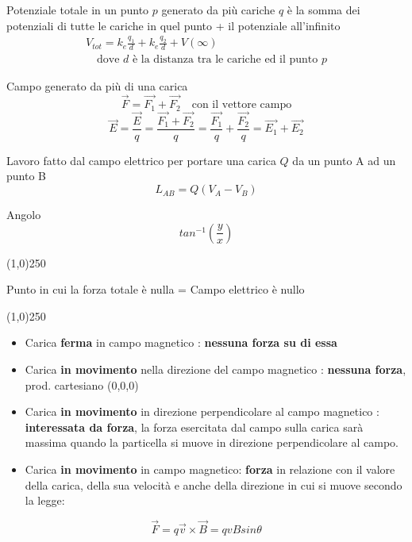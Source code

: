 \documentclass[14pt]{extarticle}
\begin{document}
Potenziale totale in un punto $p$ generato da più cariche $q$ è la somma dei potenziali di tutte le cariche in quel punto + il potenziale all'infinito
\begin{align*}
    V_{tot} = k_e\frac{q_1}{d}+k_e\frac{q_2}{d}+V(\infty) \\
    \quad\text{dove $d$ è la distanza tra le cariche ed il punto $p$}
\end{align*}

Campo generato da più di una carica
\begin{equation*}
    \overrightarrow{F}=\overrightarrow{F_1}+\overrightarrow{F_2} \quad\text{con il vettore campo}
\end{equation*}
\begin{equation*}
    \overrightarrow{E}=\frac{\overrightarrow{E}}{q}=\frac{\overrightarrow{F_1}+\overrightarrow{F_2}}{q}=\frac{\overrightarrow{F_1}}{q}+\frac{\overrightarrow{F_2}}{q}=\overrightarrow{E_1}+\overrightarrow{E_2}
\end{equation*}

Lavoro fatto dal campo elettrico per portare una carica $Q$ da un punto A ad un punto B
\begin{equation*}
    L_{AB}=Q(V_A-V_B)
\end{equation*}

Angolo
\begin{equation*}
    tan^{-1}(\frac{y}{x})
\end{equation*}

\begin{center}
    \line(1,0){250}
\end{center}
Punto in cui la forza totale è nulla = Campo elettrico è nullo
\begin{center}
    \line(1,0){250}
\end{center}
\begin{itemize}
    \item Carica \textbf{ferma} in campo magnetico : \textbf{nessuna forza su di essa}
    \item Carica \textbf{in movimento} nella direzione del campo magnetico : \textbf{nessuna forza}, prod. cartesiano (0,0,0)
    \item Carica \textbf{in movimento} in direzione perpendicolare al campo magnetico : \textbf{interessata da forza}, la forza esercitata dal campo sulla carica sarà massima 
    quando la particella si muove in direzione perpendicolare al campo.
    \item Carica \textbf{in movimento} in campo magnetico: \textbf{forza} in relazione con il valore della carica, della sua velocità e anche della direzione in cui
    si muove secondo la legge:
\end{itemize}
\begin{equation*}
    \overrightarrow{F}=q\overrightarrow{v}\times\overrightarrow{B}=qvBsin\theta
\end{equation*}
\end{document}
